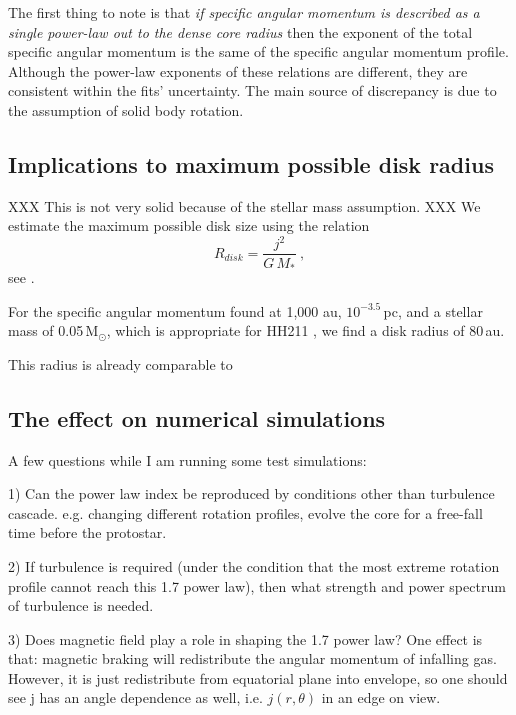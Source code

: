 The first thing to note is that \emph{if specific angular momentum is described as a single power-law out to the dense core radius} 
then the exponent of the total specific angular momentum is the same of the 
specific angular momentum profile. 
%
Although the power-law exponents of these relations are different, they are 
consistent within the fits' uncertainty. 
The main source of discrepancy is due to the assumption of solid body rotation.

\subsection{Implications to maximum possible disk radius}
XXX This is not very solid because of the stellar mass assumption. XXX
We estimate the maximum possible disk size using the relation
\begin{equation}
R_{disk} = \frac{j^2}{G\,M_*}~,
\end{equation}
see \cite{Yen_2015}.

For the specific angular momentum found at 1,000 au, $10^{-3.5}$\,\kms pc, and a stellar mass 
of 0.05\,M$_\odot$, which is appropriate for HH211 \citep{Lee_2009,Froebrich_2003},  
we find a disk radius of 80\,au.

This radius is already comparable to 

\subsection{The effect on numerical simulations}
A few questions while I am running some test simulations:

1) Can the power law index be reproduced by conditions other than turbulence cascade.
  e.g. changing different rotation profiles, evolve the core for a free-fall time before the protostar. 
  
2) If turbulence is required (under the condition that the most extreme rotation profile cannot reach this 1.7 power law), then what strength and power spectrum of turbulence is needed.

3) Does magnetic field play a role in shaping the 1.7 power law?
  One effect is that: magnetic braking will redistribute the angular momentum of infalling gas.
  However, it is just redistribute from equatorial plane into envelope, so one should see j has an angle dependence as well, i.e. $j(r,\theta)$ in an edge on view.

  

  
  